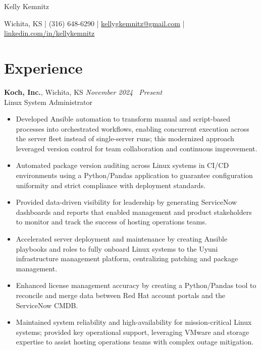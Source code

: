 \documentclass[10pt]{article}       %
\begin{document}
\centerline{\Huge Kelly Kemnitz}

\vspace{5pt}

\centerline{\large Wichita, KS | (316) 648-6290 | \href{mailto:kellygkemnitz@gmail.com}{kellygkemnitz@gmail.com} | \href{https://www.linkedin.com/in/kellykemnitz/}{linkedin.com/in/kellykemnitz}}

\vspace{-10pt}

\section*{Experience}
\textbf{Koch, Inc.}, Wichita, KS \hfill \textit{November 2024 \textendash\ Present} \\
\vspace{1pt}
Linux System Administrator \\
\begin{itemize}
  \item Developed Ansible automation to transform manual and script-based processes into orchestrated workflows, enabling concurrent execution across the server fleet instead of single-server runs; this modernized approach leveraged version control for team collaboration and continuous improvement.
  \item Automated package version auditing across Linux systems in CI/CD environments using a Python/Pandas application to guarantee configuration uniformity and strict compliance with deployment standards.
  \item Provided data-driven visibility for leadership by generating ServiceNow dashboards and reports that enabled management and product stakeholders to monitor and track the success of hosting operations teams.
  \item Accelerated server deployment and maintenance by creating Ansible playbooks and roles to fully onboard Linux systems to the Uyuni infrastructure management platform, centralizing patching and package management.
  \item Enhanced license management accuracy by creating a Python/Pandas tool to reconcile and merge data between Red Hat account portals and the ServiceNow CMDB.
  \item Maintained system reliability and high-availability for mission-critical Linux systems; provided key operational support, leveraging VMware and storage expertise to assist hosting operations teams with complex outage mitigation.
\end{itemize}
\end{document}
